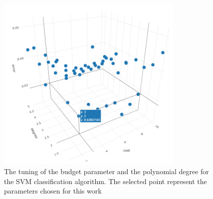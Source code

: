 \documentclass[
12pt, %
a4paper, %
oneside, %
headinclude,footinclude, %
BCOR5mm, %
]{scrartcl}
\begin{document}
\begin{figure}[h]
\begin{center}
\includegraphics[width=0.8\textwidth]{Pic/SVM_tuning.png}
\caption{The tuning of the budget parameter and the polynomial degree for the SVM classification algorithm. The selected point represent the parameters chosen for this work}
\label{SVM_tuning}
\end{center}
\end{figure}
\end{document}
